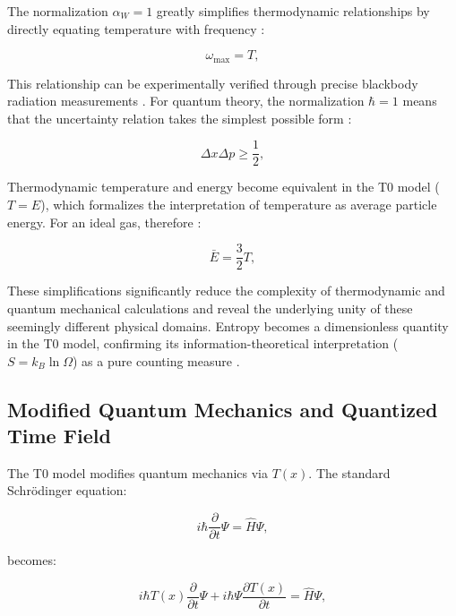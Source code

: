 \documentclass[twocolumn,aps,prl]{revtex4-2}
\begin{document}
	The normalization $\alpha_W = 1$ greatly simplifies thermodynamic relationships by directly equating temperature with frequency \cite{Wien1896, Planck1901}:
	
	\begin{equation}
		\omega_{\text{max}} = T, \label{eq:wien_simplified}
	\end{equation}
	
	This relationship can be experimentally verified through precise blackbody radiation measurements \cite{pascher_alpha_2025}. For quantum theory, the normalization $\hbar = 1$ means that the uncertainty relation takes the simplest possible form \cite{Heisenberg1925}:
	
	\begin{equation}
		\Delta x \Delta p \geq \frac{1}{2}, \label{eq:uncertainty_simplified}
	\end{equation}
	
	Thermodynamic temperature and energy become equivalent in the T0 model ($T = E$), which formalizes the interpretation of temperature as average particle energy. For an ideal gas, therefore \cite{Boltzmann1872}:
	
	\begin{equation}
		\bar{E} = \frac{3}{2} T, \label{eq:average_energy}
	\end{equation}
	
	These simplifications significantly reduce the complexity of thermodynamic and quantum mechanical calculations and reveal the underlying unity of these seemingly different physical domains. Entropy becomes a dimensionless quantity in the T0 model, confirming its information-theoretical interpretation ($S = k_B \ln \Omega$) as a pure counting measure \cite{pascher_alpha_2025}.
	
	\subsection{Modified Quantum Mechanics and Quantized Time Field}
	\label{subsec:quantum}
	
	The T0 model modifies quantum mechanics via $T(x)$. The standard Schrödinger equation:
	
	\begin{equation}
		i \hbar \frac{\partial}{\partial t} \Psi = \hat{H} \Psi, \label{eq:std_schrodinger}
	\end{equation}
	
	becomes:
	
	\begin{equation}
		i \hbar T(x) \frac{\partial}{\partial t} \Psi + i \hbar \Psi \frac{\partial T(x)}{\partial t} = \hat{H} \Psi, \label{eq:mod_schrodinger}
	\end{equation}
	
\end{document}
